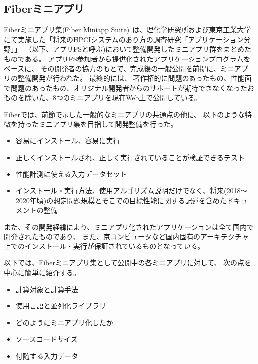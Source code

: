 \subsection{Fiberミニアプリ}
Fiberミニアプリ集(Fiber Miniapp Suite)~\cite{Fiber}は、理化学研究所および東京工業大学にて実施した「将来のHPCIシステムのあり方の調査研究「アプリケーション分野」」~\cite{ApliFS}（以下、アプリFSと呼ぶ)において整備開発したミニアプリ群をまとめたものである。
アプリFS参加者から提供化されたアプリケーションプログラムをベースに、
その開発者の協力のもとで、完成後の一般公開を前提に、ミニアプリの整備開発が行われた。
最終的には、
著作権的に問題のあったもの、性能面で問題のあったもの、オリジナル開発者からのサポートが期待できなくなったおものを除いた、8つのミニアプリを現在Web上で公開している。

Fiberでは、前節で示した一般的なミニアプリの共通点の他に、
以下のような特徴を持ったミニアプリ集を目指して開発整備を行った。

\begin{itemize}
\item 容易にインストール、容易に実行
\item 正しくインストールされ、正しく実行されていることが検証できるテスト
\item 性能計測に使える入力データセット
\item インストール・実行方法、使用アルゴリズム説明だけでなく、将来(2018〜2020年頃)の想定問題規模とそこでの目標性能に関する記述を含めたドキュメントの整備
 \end{itemize}

また、その開発経緯により、ミニアプリ化されたアプリケーションは全て国内で開発されたものであり、
また、京コンピュータなど国内固有のアーキテクチャ上でのインストール・実行が保証されているものとなっている。

以下では、Fiberミニアプリ集として公開中の各ミニアプリに対して、
次の点を中心に簡単に紹介する。
\begin{itemize}
\item 計算対象と計算手法
\item 使用言語と並列化ライブラリ
\item どのようにミニアプリ化したか
\item ソースコードサイズ       
\item 付随する入力データ
\end{itemize}

